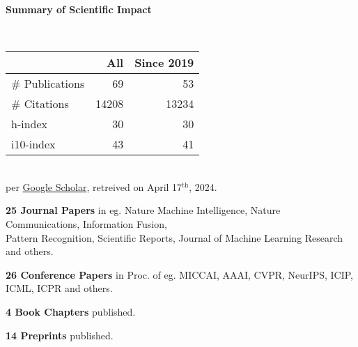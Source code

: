 \headedsection %
{\bf Summary of Scientific Impact}{}{}
{
    \qquad~~~~
    \begin{minipage}[t]{0.6\textwidth}
        \begin{tabular}{lrr}
        \hline
         & All & Since 2019\\
        \hline
        \# Publications & 69     & 53    \\
        \# Citations    & 14208  & 13234 \\
        h-index         & 30     & 30    \\
        i10-index       & 43     & 41    \\
        \hline
    \end{tabular}
    \\
    {\footnotesize{
        per \href{https://scholar.google.com/citations?user=wpLQuroAAAAJ}{Google Scholar},
        retreived on April 17$^\text{th}$, 2024.
        }
    }
    \end{minipage}

    \ifdefined\shortcv
        \vstep
        {\bf 25 Journal Papers} in eg. Nature Machine Intelligence, Nature Communications, Information Fusion,\\
        \hspace*{\fill} Pattern Recognition, Scientific Reports, Journal of Machine Learning Research and others.

        {\bf 26 Conference Papers} in Proc. of eg. MICCAI, AAAI, CVPR, NeurIPS, ICIP, ICML, ICPR and others.

        {\bf 4 Book Chapters} published.

        {\bf 14 Preprints} published.
        
    \else
        {}
    \fi

}
